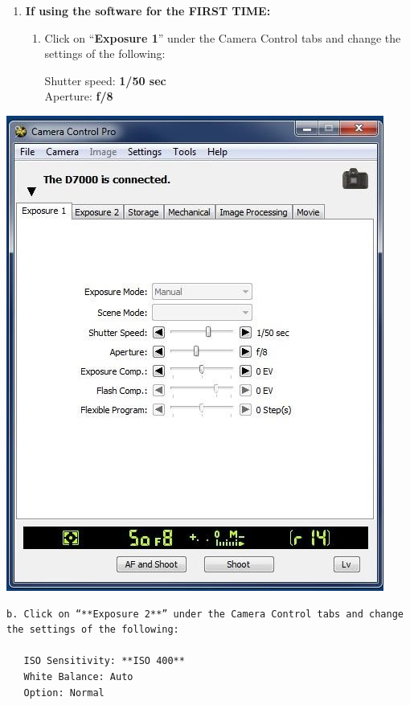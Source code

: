 \documentclass[]{book}
\begin{document}
\begin{enumerate}
\def\labelenumi{\arabic{enumi}.}
\setcounter{enumi}{4}
\item
  \textbf{If using the software for the FIRST TIME:}

  \begin{enumerate}
  \def\labelenumii{\alph{enumii}.}
  \item
    Click on ``\textbf{Exposure 1}'' under the Camera Control tabs and change the settings of the following:

    Shutter speed: \textbf{1/50 sec}\\
    Aperture: \textbf{f/8}
  \end{enumerate}
\end{enumerate}

\includegraphics{images/Camera3.jpg}

\begin{verbatim}
b. Click on “**Exposure 2**” under the Camera Control tabs and change the settings of the following:  

   ISO Sensitivity: **ISO 400**  
   White Balance: Auto  
   Option: Normal
\end{verbatim}
\end{document}
